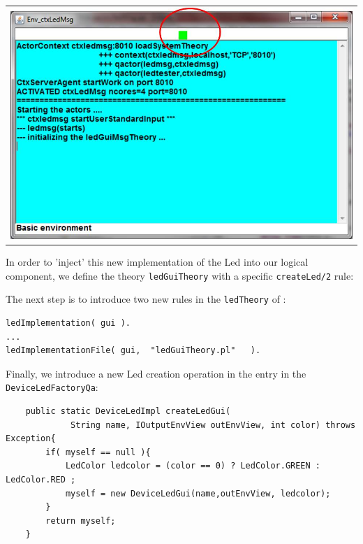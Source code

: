 \begin{center}
\begin{tabular}{ c }
     \includegraphics[scale = 0.45]{./img/ledGui.jpg}\\
\end{tabular}{   }
\end{center}

In order to 'inject' this new implementation of the Led into our logical component, we define the theory \texttt{ledGuiTheory} with a specific \texttt{createLed/2} rule: 




The next step is to introduce two new rules in  the \texttt{ledTheory} of :

\begin{lstlisting}
ledImplementation( gui ).
...
ledImplementationFile( gui,  "ledGuiTheory.pl"   ).
\end{lstlisting}
 
Finally, we introduce a new Led creation operation in the entry in the \texttt{DeviceLedFactoryQa}:
\begin{lstlisting}
    public static DeviceLedImpl createLedGui(  
    		 String name, IOutputEnvView outEnvView, int color) throws Exception{
     	if( myself == null ){
  	  		LedColor ledcolor = (color == 0) ? LedColor.GREEN : LedColor.RED ;
	  		myself = new DeviceLedGui(name,outEnvView, ledcolor);  			 
  		}
  		return myself;
   	}
\end{lstlisting}
\newpage 
